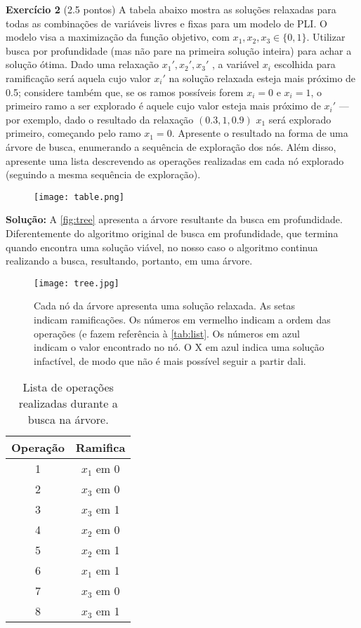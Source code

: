\noindent \textbf{Exercício 2} (2.5 pontos) A tabela abaixo mostra as soluções relaxadas para
todas as combinações de variáveis livres e fixas para um modelo de PLI.
O modelo visa a maximização da função objetivo, com $x_1, x_2, x_3 \in \{0, 1\}$.
Utilizar busca por profundidade (mas não pare na primeira solução inteira)
para achar a solução ótima. Dado uma relaxação $x_1' , x_2', x_3'$ , a variável $x_i$
escolhida para ramificação será aquela cujo valor $x_i'$ na solução relaxada
esteja mais próximo de 0.5; considere também que, se os ramos possíveis
forem $x_i = 0$ e $x_i = 1$, o primeiro ramo a ser explorado é aquele cujo valor
esteja mais próximo de $x_i'$ — por exemplo, dado o resultado da relaxação
$(0.3,1,0.9)$ $x_1$ será explorado primeiro, começando pelo ramo $x_1 = 0$.
Apresente o resultado na forma de uma árvore de busca, enumerando
a sequência de exploração dos nós. Além disso, apresente uma lista
descrevendo as operações realizadas em cada nó explorado (seguindo a
mesma sequência de exploração).

\begin{figure}[H]
    \centering
    \texttt{[image: table.png]}
\end{figure}

\bigskip

\noindent \textbf{Solução:} A \autoref{fig:tree} apresenta a árvore resultante da busca em profundidade. Diferentemente do algoritmo original de busca em profundidade, que termina quando encontra uma solução viável, no nosso caso o algoritmo continua realizando a busca, resultando, portanto, em uma árvore.

\begin{figure}[H]
    \centering
    \texttt{[image: tree.jpg]}
    \caption{Cada nó da árvore apresenta uma solução relaxada. As setas indicam ramificações. Os números em vermelho indicam a ordem das operações (e fazem referência à \autoref{tab:list}. Os números em azul indicam o valor encontrado no nó. O X em azul indica uma solução infactível, de modo que não é mais possível seguir a partir dali.}
    \label{fig:tree}
\end{figure}

\begin{table}[H]
\centering
\caption{Lista de operações realizadas durante a busca na árvore.}
\label{tab:list}
\begin{tabular}{c|c}
\textbf{Operação} & \textbf{Ramifica} \\ \hline
1                 & $x_1$ em 0        \\ \hline
2                 & $x_3$ em 0        \\ \hline
3                 & $x_3$ em 1        \\ \hline
4                 & $x_2$ em 0        \\ \hline
5                 & $x_2$ em 1        \\ \hline
6                 & $x_1$ em 1        \\ \hline
7                 & $x_3$ em 0        \\ \hline
8                 & $x_3$ em 1       
\end{tabular}
\end{table}
